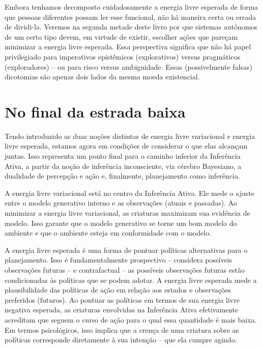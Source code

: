 \documentclass[
  12pt,
]{book}
\begin{document}
Embora tenhamos decomposto cuidadosamente a energia livre esperada de forma que pessoas diferentes possam ler esse funcional, não há maneira certa ou errada de dividi-la. Veremos na segunda metade deste livro por que sistemas autônomos de um certo tipo devem, em virtude de existir, escolher ações que pareçam minimizar a energia livre esperada. Essa perspectiva significa que não há papel privilegiado para imperativos epistêmicos (explorativos) versus pragmáticos (exploradores) -- ou para risco versus ambiguidade. Essas (possivelmente falsas) dicotomias são apenas dois lados da mesma moeda existencial.

\hypertarget{no-final-da-estrada-baixa}{%
\section{No final da estrada baixa}\label{no-final-da-estrada-baixa}}

Tendo introduzido as duas noções distintas de energia livre variacional e energia livre esperada, estamos agora em condições de considerar o que elas alcançam juntas. Isso representa um ponto final para o caminho inferior da Inferência Ativa, a partir da noção de inferência inconsciente, via cérebro Bayesiano, a dualidade de percepção e ação e, finalmente, planejamento como inferência.

A energia livre variacional está no centro da Inferência Ativa. Ele mede o ajuste entre o modelo generativo interno e as observações (atuais e passadas). Ao minimizar a energia livre variacional, as criaturas maximizam sua evidência de modelo. Isso garante que o modelo generativo se torne um bom modelo do ambiente e que o ambiente esteja em conformidade com o modelo.

A energia livre esperada é uma forma de pontuar políticas alternativas para o planejamento. Isso é fundamentalmente prospectivo -- considera possíveis observações futuras -- e contrafactual -- as possíveis observações futuras estão condicionadas às políticas que se podem adotar. A energia livre esperada mede a plausibilidade das políticas de ação em relação aos estados e observações preferidos (futuros). Ao pontuar as políticas em termos de sua energia livre negativa esperada, as criaturas envolvidas na Inferência Ativa efetivamente acreditam que seguem o curso de ação para o qual essa quantidade é mais baixa. Em termos psicológicos, isso implica que a crença de uma criatura sobre as políticas corresponde diretamente à sua intenção -- que ela cumpre agindo.
\end{document}
